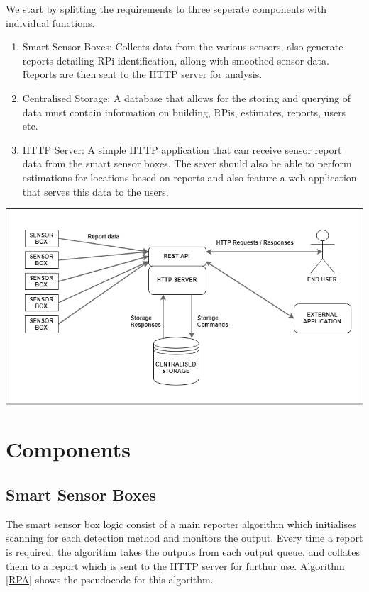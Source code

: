 \documentclass{l4proj}
\begin{document}
We start by splitting the requirements to three seperate components with individual functions.
\begin{enumerate}
  \item Smart Sensor Boxes:
	Collects data from the various sensors, also generate reports detailing RPi identification, allong with smoothed sensor data. Reports are then sent to the HTTP server for analysis. 
  \item Centralised Storage:
	A database that allows for the storing and querying of data must contain information on building, RPis, estimates, reports, users etc.
  \item HTTP Server:
	A simple HTTP application that can receive sensor report data from the smart sensor boxes. The sever should also be able to perform estimations for locations based on reports and also feature a web application that serves this data to the users. 
\end{enumerate}
\includegraphics[width=\textwidth]{overalldiag}


\section{Components}
\subsection{Smart Sensor Boxes}
The smart sensor box logic consist of a main reporter algorithm which initialises scanning for each detection method and monitors the output. Every time a report is required, the algorithm takes the outputs from each output queue, and collates them to a report which is sent to the HTTP server for furthur use.  Algorithm \ref{RPA} shows the pseudocode for this algorithm.
\end{document}
